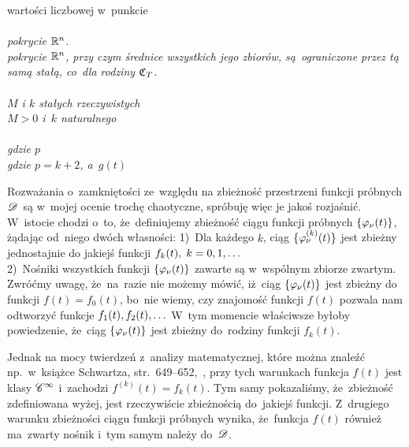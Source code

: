 \documentclass[a4paper,11pt]{article}
\begin{document}
\Pow wartości liczbowej w~punkcie \\
 \\
\Jest \emph{pokrycie $\mathbb{R}^{ n }$.} \\
\Pow \emph{pokrycie $\mathbb{R}^{ n }$, przy czym średnice wszystkich jego zbiorów,
  są~ograniczone przez tą samą stałą, co~dla rodziny $\mathfrak{C}_{ T }$.} \\
 \\
\Jest \emph{$M$ i $k$ stałych rzeczywistych} \\
\Pow \emph{$M > 0$ i~$k$ naturalnego} \\
 \\
\Jest \emph{gdzie $p$} \\
\Pow \emph{gdzie $p = k + 2$, a~$g( t )$} \\







\noi {}

\vspace{\spaceThree}

\start {} Rozważania o~zamkniętości ze~względu na zbieżność
przestrzeni funkcji próbnych $\mathcal{D}$~są w~mojej ocenie trochę chaotyczne,
spróbuję więc je jakoś rozjaśnić. W~istocie chodzi o~to,
że~definiujemy zbieżność ciągu funkcji próbnych
$\{  \varphi_{ \nu }( t )  \}$, żądając od~niego dwóch własności: 1)~Dla
każdego $k$, ciąg $\{  \varphi_{ \nu }^{ ( k ) }( t )  \}$ jest zbieżny
jednostajnie do jakiejś funkcji
$f_{ k }( t ), \; k = 0, 1, \ldots$ \\
2)~Nośniki wszystkich funkcji $\{  \varphi_{ \nu }( t )  \}$ zawarte są
w~wspólnym zbiorze zwartym. \\
Zwróćmy uwagę, że~na~razie nie możemy mówić, iż~ciąg
$\{  \varphi_{ \nu }( t )  \}$ jest zbieżny do funkcji
$f( t ) = f_{ 0 }( t )$, bo~nie wiemy, czy znajomość funkcji $f( t )$
pozwala nam odtworzyć funkcje $f_{ 1 }( t ), f_{ 2 }( t ), \ldots$ W~tym
momencie właściwsze byłoby powiedzenie, że~ciąg
$\{  \varphi_{ \nu }( t )  \}$ jest zbieżny do~rodziny funkcji
$f_{ k }( t )$.

Jednak na mocy twierdzeń z~analizy matematycznej, które można znaleźć
np.~w~książce Schwartza, str.~649--652,~\cite{Sch79}, przy tych
warunkach funkcja $f( t )$ jest klasy $\mathcal{C}^{ \infty }$ i~zachodzi
$f^{ ( k ) }( t ) = f_{ k }( t )$. Tym samy pokazaliśmy, że~zbieżność
zdefiniowana wyżej, jest rzeczywiście zbieżnością do~jakiejś funkcji.
Z~drugiego warunku zbieżności ciągu funkcji próbnych wynika,
że~funkcja $f( t )$ również ma~zwarty nośnik i~tym samym należy
do~$\mathcal{D}$.
\end{document}
